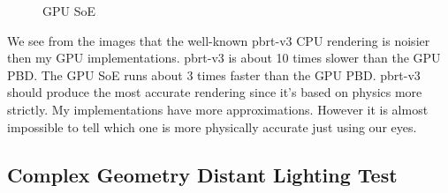 \documentclass[letterpaper,12pt]{article}
\begin{document}
\begin{figure}[H]
    \centering
    \caption{GPU SoE}%
    \label{}%
\end{figure}

We see from the images that the well-known pbrt-v3 CPU rendering is noisier then my GPU implementations. pbrt-v3 is about 10 times slower than the GPU PBD. The GPU SoE runs about 3 times faster than the GPU PBD. pbrt-v3 should produce the most accurate rendering since it's based on physics more strictly. My implementations have more approximations. However it is almost impossible to tell which one is more physically accurate just using our eyes.

\subsection{Complex Geometry Distant Lighting Test}
\end{document}
